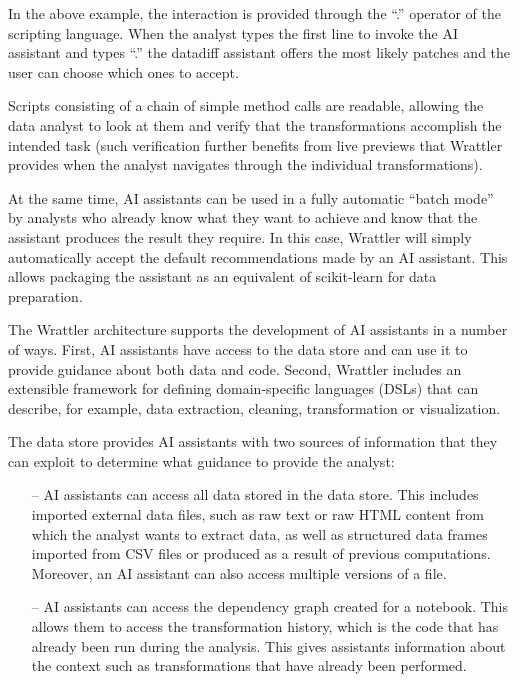 \documentclass[sigplan,preprint,10pt]{acmart}\settopmatter{printfolios=true,printccs=false,printacmref=false}
\begin{document}
{In the above example, the interaction is provided through the ``.'' operator of the scripting
language. When the analyst types the first line to invoke the AI assistant and types ``.''
the datadiff assistant offers the most likely patches and the user can choose which ones
to accept. 

Scripts consisting of a chain of simple method calls are readable, allowing the data analyst to look at them
and verify that the transformations accomplish the intended task (such verification further
benefits from live previews that Wrattler provides when the analyst navigates through the
individual transformations).

At the same time, AI assistants can be used in a fully automatic ``batch mode'' by analysts
who already know what they want to achieve and know that the assistant produces the result they
require. In this case, Wrattler will simply automatically accept the default recommendations made
by an AI assistant. This allows packaging the assistant as an equivalent of scikit-learn for
data preparation.

\vspace{1em}
\noindent
The Wrattler architecture supports the development of AI assistants in a number of ways. First, AI
assistants have access to the data store and can use it to provide guidance about both data and
code. Second, Wrattler includes an extensible framework for defining domain-specific languages
(DSLs) that can describe, for example, data extraction, cleaning, transformation or visualization.

The data store provides AI assistants with
two sources of information that they can exploit
to determine what guidance to provide the analyst:
%
\begin{itemize}
\item[--] AI assistants can access all data stored in the data
store. This includes imported external data files, such as raw text or raw HTML content from which
the analyst wants to extract data, as well as structured data frames imported from CSV files or
produced as a result of previous computations. Moreover, an AI assistant can also access multiple
versions of a file.

\item[--] AI assistants can access the dependency graph created for a
notebook. This allows them to access the transformation history, which is the code
that has already been run during the analysis. This gives assistants information about the
context such as transformations that have already been performed.
\end{itemize}

}
\end{document}
